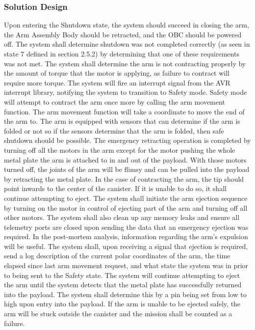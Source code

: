 \documentclass[letterpaper,10pt]{article}
\begin{document}
\subsubsection{Solution Design}
Upon entering the Shutdown state, the system should succeed in closing the arm, the Arm Assembly Body should be retracted, 
and the \gls{OBC} should be powered off. 
The system shall determine shutdown was not completed correctly (as seen in state 7 defined in section 2.5.2) by determining that one 
of these requirements was not met.
The system shall determine the arm is not contracting properly by the amount of torque that the motor is applying, as failure to 
contract will require more torque. The system will fire an interrupt signal from the AVR interrupt library, notifying the system to 
transition to Safety mode. 
Safety mode will attempt to contract the arm once more by calling the arm movement function. The arm movement function will take a 
coordinate to move the end of the arm to. The arm is equipped with sensors that can determine if the arm is folded or not
so if the sensors determine that the arm is folded, then safe shutdown should be possible.
The emergency retracting operation is completed by turning off all the motors in the 
 arm except for the motor pushing the whole metal plate the arm is attached to in and out of the payload.
With those motors turned off, the joints of the arm will be flimsy and can be pulled into the payload by retracting the metal plate.
In the case of contracting the arm, the tip should point inwards to the center of the canister.
If it is unable to do so, it shall continue attempting to eject. 
The system shall initiate the arm ejection sequence by turning on the motor in control of ejecting part of the arm and turning off all
other motors. 
The system shall also clean up any memory leaks and ensure all telemetry ports are closed upon sending the data that an 
emergency ejection was required. In the post-mortem analysis, information regarding the arm's expulsion will be useful. The system
shall, upon receiving a signal that ejection is required, send a log description of the current polar coordinates of the arm, the time 
elapsed since last arm movement request, and what state the system was in prior to being sent to the Safety state. The system will 
continue attempting to eject the arm until the system detects that the metal plate has successfully returned into the payload. 
The system shall determine this by a pin being set from low to high upon entry into the payload. 
If the arm is unable to be ejected safely, the arm will be stuck outside the canister and the mission shall be counted
as a failure.
\end{document}
